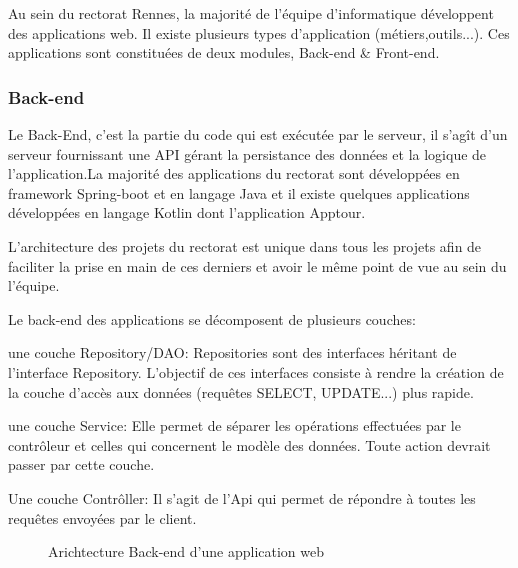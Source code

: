 \documentclass[a4paper]{article}
\begin{document}
Au sein du rectorat Rennes, la majorité de l'équipe d'informatique  développent des applications web. Il existe plusieurs types d'application (métiers,outils...). Ces applications sont constituées de deux modules, Back-end \&  Front-end.

\subsubsection{Back-end}

Le Back-End, c’est la partie du code qui est exécutée par le serveur, il s’agît d'un serveur fournissant une API gérant la persistance des données et la logique de l'application.La majorité des applications du rectorat sont développées en framework Spring-boot et en langage Java et il existe quelques applications développées en langage Kotlin dont l'application Apptour.

L'architecture des projets du rectorat est unique dans tous les projets afin  de faciliter la prise en main de ces derniers et avoir le même point de vue au sein du l'équipe.

Le back-end des applications se décomposent de plusieurs couches: 

une couche Repository/DAO: Repositories sont des interfaces héritant de l'interface Repository. L'objectif de ces interfaces consiste à rendre la création de la couche d'accès aux données (requêtes SELECT, UPDATE...) plus rapide.

une couche Service: Elle permet de séparer les opérations effectuées par le contrôleur et celles qui concernent le modèle des données. Toute action devrait passer par cette couche.

Une couche Contrôller: Il s'agit de l'Api qui permet de répondre à toutes les requêtes envoyées par le client. 

\begin{figure}[H]
	\centering
  		\caption{Arichtecture Back-end d'une application web}
	\end{figure}
\end{document}
